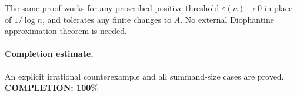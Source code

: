 The same proof works for any prescribed positive threshold \(\varepsilon(n)\to0\) in place of \(1/\log n\), and tolerates any finite changes to \(A\). No external Diophantine approximation theorem is needed.

\paragraph{Completion estimate.}
An explicit irrational counterexample and all summand-size cases are proved.
\textbf{COMPLETION: 100\%}
